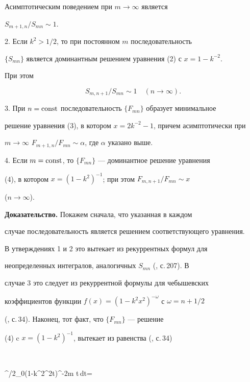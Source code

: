 Асимптотическим поведением при $m\to\infty$ является 


$S_{m+1,n}/S_{mn}\sim 1$. 


 


2. Если $k^2>1/2$, то при постоянном $m$ последовательность 


$\{S_{mn}\}$ является доминантным решением уравнения (2) с $x=1-k^{-2}$. 


При этом 


$$ 


S_{m,n+1}/S_{mn}\sim 1\quad (n\to\infty). 


$$ 


 


3. При $n=\operatorname{const}$ последовательность $\{F_{mn}\}$ образует минимальное 


решение уравнения (3), в котором $x=2k^{-2}-1$, причем асимптотически при 


$m\to\infty$\; $F_{m+1,n}/F_{mn}\sim\alpha$, где $\alpha$ указано выше. 


 


4. Если $m=\operatorname{const}$, то $\{F_{mn}\}$ --- доминантное решение уравнения 


(4), в котором $x=(1-k^2)^{-1}$; при этом $F_{m,n+1}/F_{mn}\sim x$ 


($n\to\infty$). 


\medskip 


 


{\bf Доказательство.} Покажем сначала, что указанная в каждом


случае последовательность является решением соответствующего уравнения. 


В утверждениях 1 и 2 это вытекает из рекуррентных формул для 


неопределенных интегралов, аналогичных $S_{mn}$ (\cite{7}, с.\,207). В 


случае 3 это следует из рекуррентной формулы для чебышевских 


коэффициентов функции $f(x)=(1-k^2x^2)^{-\omega}$ с $\omega=n+1/2$ 


(\cite{4}, с.\,34). Наконец, тот факт, что $\{F_{mn}\}$ --- решение 


(4) c $x=(1-k^2)^{-1}$, вытекает из равенства (\cite{4}, с.\,34) 


$$ 


\int^{\pi/2}_0(1-k^2\sin^2t)^{-\omega}\cos2m t\,dt= 


